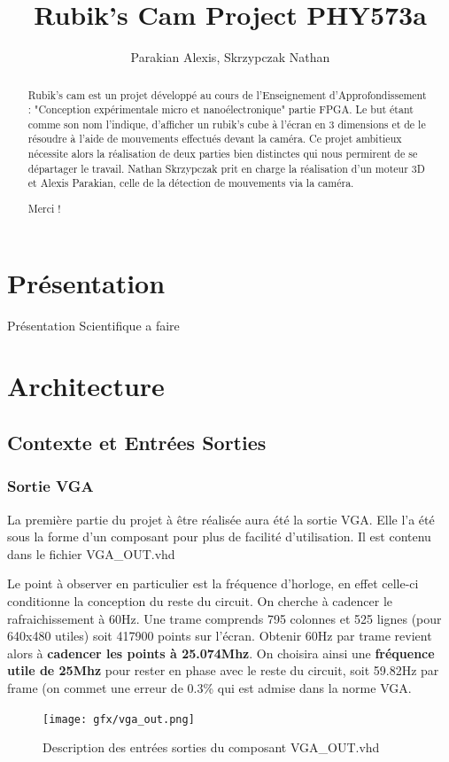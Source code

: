 \documentclass[10pt,a4paper]{report}
\author{Parakian Alexis, Skrzypczak Nathan}
\title{Rubik's Cam Project PHY573a}
\newenvironment*{remerciements}{%
\renewcommand*{\abstractname}{Remerciements}
\begin{abstract}
}{\end{abstract}}
\begin{document}
\maketitle

\begin{abstract}
Rubik's cam est un projet développé au cours de l'Enseignement d'Approfondissement : "Conception expérimentale micro et nanoélectronique" partie FPGA. Le but étant comme son nom l'indique, d'afficher un rubik's cube à l'écran en 3 dimensions et de le résoudre à l'aide de mouvements effectués devant la caméra. Ce projet ambitieux nécessite alors la réalisation de deux parties bien distinctes qui nous permirent de se départager le travail. Nathan Skrzypczak prit en charge la réalisation d'un moteur 3D et Alexis Parakian, celle de la détection de mouvements via la caméra.
\end{abstract}

\begin{remerciements}
Merci !
\end{remerciements}

\tableofcontents
\newpage

\chapter{Présentation}

Présentation Scientifique a faire

\chapter{Architecture}

\section{Contexte et Entrées Sorties}

\subsection{Sortie VGA}

La première partie du projet à être réalisée aura été la sortie VGA. Elle l'a été sous la forme d'un composant pour plus de facilité d'utilisation. Il est contenu dans le fichier VGA\_OUT.vhd

Le point à observer en particulier est la fréquence d'horloge, en effet celle-ci conditionne la conception du reste du circuit.  On cherche à cadencer le rafraichissement à 60Hz. Une trame comprends 795 colonnes et 525 lignes (pour 640x480 utiles) soit 417900 points sur l'écran. Obtenir 60Hz par trame revient alors à \textbf{cadencer les points à 25.074Mhz}. On choisira ainsi une \textbf{fréquence utile de 25Mhz} pour rester en phase avec le reste du circuit, soit 59.82Hz par frame (on commet une erreur de 0.3\% qui est admise dans la norme VGA.
\begin{figure}[!h]
\centering
\texttt{[image: gfx/vga\_out.png]}
\caption{Description des entrées sorties du composant VGA\_OUT.vhd}
\end{figure}
\end{document}

